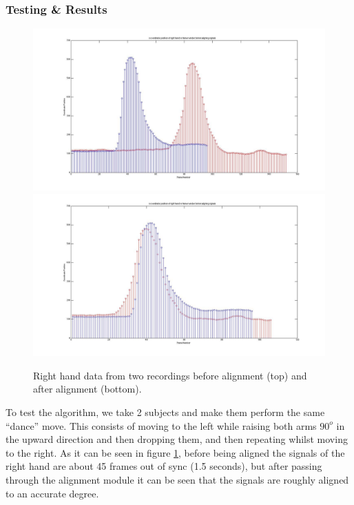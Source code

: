 \documentclass[10pt,a4paper]{article}
\begin{document}
\subsubsection{Testing \& Results}

\begin{figure}[h]
\centering
\includegraphics[scale=0.15]{Initial_Frame_Det_Before.jpg}
\includegraphics[scale=0.15]{Initial_Frame_Det_After.jpg}
\caption{Right hand data from two recordings before alignment (top) and after alignment (bottom).}
\label{pre_post_alginment}
\end{figure}
\noindent
To test the algorithm, we take 2 subjects and make them perform the same ``dance'' move. This consists of moving to the left while raising both arms $90^o$ in the upward direction and then dropping them, and then repeating whilst moving to the right. 
As it can be seen in figure \ref{pre_post_alginment}, before being aligned the signals of the right hand are about 45 frames out of sync (1.5 seconds), but after passing through the alignment module it can be seen that the signals are roughly aligned to an accurate degree. 

\clearpage
\end{document}
